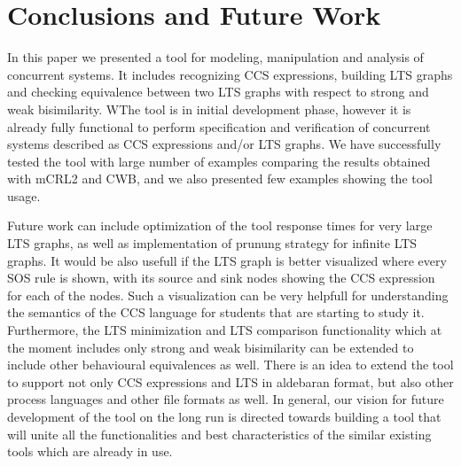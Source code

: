 \section{Conclusions and Future Work}
In this paper we presented a tool for modeling, manipulation and analysis of concurrent systems. It includes recognizing CCS expressions, building LTS graphs and checking equivalence between two LTS graphs with respect to strong and weak bisimilarity. WThe tool is in initial development phase, however it is already fully functional to perform specification and verification of concurrent systems described as CCS expressions and/or LTS graphs. We have successfully tested the tool with large number of examples comparing the results obtained with mCRL2 and CWB, and we also presented few examples showing the tool usage. 

Future work can include optimization of the tool response times for very large LTS graphs, as well as implementation of prunung strategy for infinite LTS graphs. It would be also usefull if the LTS graph is better visualized where every SOS rule is shown, with its source and sink nodes showing the CCS expression for each of the nodes. Such a visualization can be very helpfull for understanding the semantics of the CCS language for students that are starting to study it. Furthermore, the LTS minimization and LTS comparison functionality which at the moment includes only strong and weak bisimilarity can be extended to include other behavioural equivalences as well. There is an idea to extend the tool to support not only CCS expressions and LTS in aldebaran format, but also other process languages and other file formats as well. In general, our vision for future development of the tool on the long run is directed towards building a tool that will unite all the functionalities and best characteristics of the similar existing tools which are already in use.
